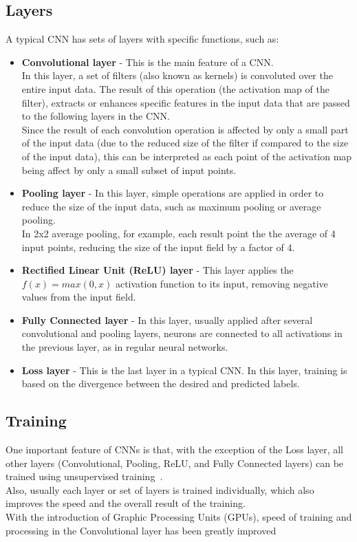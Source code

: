 \subsection{Layers}
\label{sec:convolution:convolutionalneuralnetworks:layers}
A typical CNN has sets of layers with specific functions, such as:
\begin{itemize}
    \item \textbf{Convolutional layer} - This is the main feature of a CNN.\\
    In this layer, a set of filters (also known as kernels) is convoluted over the entire input data. The result of this operation (the activation map of the filter), extracts or enhances specific features in the input data that are passed to the following layers in the CNN.\\
    Since the result of each convolution operation is affected by only a small part of the input data (due to the reduced size of the filter if compared to the size of the input data), this can be interpreted as each point of the activation map being affect by only a small subset of input points.
    \item \textbf{Pooling layer} - In this layer, simple operations are applied in order to reduce the size of the input data, such as maximum pooling or average pooling.\\
    In 2x2 average pooling, for example, each result point the the average of 4 input points, reducing the size of the input field by a factor of 4.
    \item \textbf{Rectified Linear Unit (ReLU) layer} - This layer applies the $f(x) = max(0,x)$ activation function to its input, removing negative values from the input field.
    \item \textbf{Fully Connected layer} - In this layer, usually applied after several convolutional and pooling layers, neurons are connected to all activations in the previous layer, as in regular neural networks.
    \item \textbf{Loss layer} - This is the last layer in a typical CNN. In this layer, training is based on the divergence between the desired and predicted labels.
\end{itemize}
\subsection{Training}
\label{sec:convolution:convolutionalneuralnetworks:training}
One important feature of CNNs is that, with the exception of the Loss layer, all other layers (Convolutional, Pooling, ReLU, and Fully Connected layers) can be trained using unsupervised training~\citep{Arel2010}.\\
Also, usually each layer or set of layers is trained individually, which also improves the speed and the overall result of the training.\\
With the introduction of Graphic Processing Units (GPUs), speed of training and processing in the Convolutional layer has been greatly improved~\citep{Steinkrau2005}
